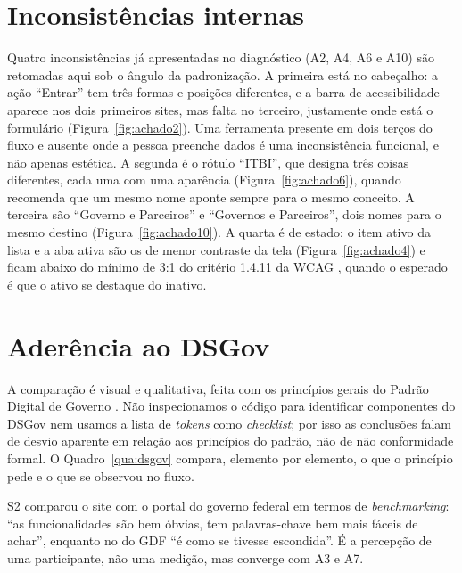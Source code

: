 \documentclass[
  12pt,
  oneside,
  a4paper,
  chapter=TITLE,
  section=TITLE,
  english,
  brazilian
]{abntex2}
\begin{document}
\section{Inconsistências internas}\label{sec:padr-int}

Quatro inconsistências já apresentadas no diagnóstico (A2, A4, A6 e A10) são retomadas aqui sob o ângulo da padronização. A primeira está no cabeçalho: a ação ``Entrar'' tem três formas e posições diferentes, e a barra de acessibilidade aparece nos dois primeiros sites, mas falta no terceiro, justamente onde está o formulário (Figura~\ref{fig:achado2}). Uma ferramenta presente em dois terços do fluxo e ausente onde a pessoa preenche dados é uma inconsistência funcional, e não apenas estética. A segunda é o rótulo ``ITBI'', que designa três coisas diferentes, cada uma com uma aparência (Figura~\ref{fig:achado6}), quando  recomenda que um mesmo nome aponte sempre para o mesmo conceito. A terceira são ``Governo e Parceiros'' e ``Governos e Parceiros'', dois nomes para o mesmo destino (Figura~\ref{fig:achado10}). A quarta é de estado: o item ativo da lista e a aba ativa são os de menor contraste da tela (Figura~\ref{fig:achado4}) e ficam abaixo do mínimo de 3:1 do critério 1.4.11 da WCAG \cite{wcag22}, quando o esperado é que o ativo se destaque do inativo.

\section{Aderência ao DSGov}

A comparação é visual e qualitativa, feita com os princípios gerais do Padrão
Digital de Governo \cite{dsgov}. Não inspecionamos o código para identificar componentes do
DSGov nem usamos a lista de \textit{tokens} como \textit{checklist}; por isso as
conclusões falam de desvio aparente em relação aos princípios do padrão, não de
não conformidade formal. O Quadro~\ref{qua:dsgov} compara, elemento por elemento, o que o princípio pede e o que se observou no fluxo.

S2 comparou o site com o portal do governo federal em termos de \textit{benchmarking}:
``as funcionalidades são bem óbvias, tem palavras-chave bem mais fáceis de
achar'', enquanto no do GDF ``é como se tivesse escondida''. É a percepção de uma
participante, não uma medição, mas converge com A3 e A7.
\end{document}

